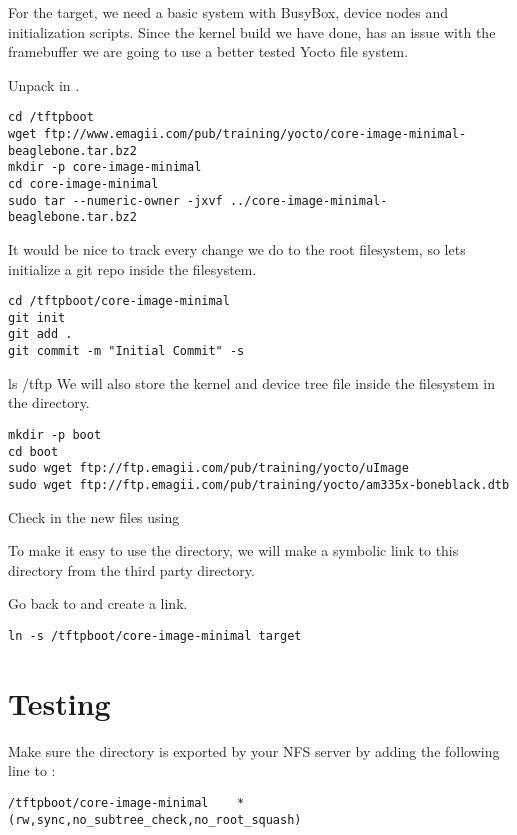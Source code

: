 For the target, we need a basic system with BusyBox, device nodes and
initialization scripts.
Since the kernel build we have done, has an issue with the framebuffer
we are going to use a better tested Yocto file system.

Unpack 
in .

\begin{verbatim}
cd /tftpboot
wget ftp://www.emagii.com/pub/training/yocto/core-image-minimal-beaglebone.tar.bz2
mkdir -p core-image-minimal
cd core-image-minimal
sudo tar --numeric-owner -jxvf ../core-image-minimal-beaglebone.tar.bz2
\end{verbatim}

It would be nice to track every change we do to the root filesystem,
so lets initialize a git repo inside the filesystem.

\begin{verbatim}
cd /tftpboot/core-image-minimal
git init
git add .
git commit -m "Initial Commit" -s
\end{verbatim}
ls /tftp	
We will also store the kernel and device tree file inside the filesystem in the  directory.

\begin{verbatim}
mkdir -p boot
cd boot
sudo wget ftp://ftp.emagii.com/pub/training/yocto/uImage
sudo wget ftp://ftp.emagii.com/pub/training/yocto/am335x-boneblack.dtb
\end{verbatim}

Check in the new files using 

To make it easy to use the directory, we will make a symbolic link to
this directory from the third party directory.

Go back to  and create a link.

\begin{verbatim}
ln -s /tftpboot/core-image-minimal target
\end{verbatim}
\clearpage

\section{Testing}


Make sure the  directory is exported by your NFS server
by adding the following line to :

\begin{verbatim}
/tftpboot/core-image-minimal	*(rw,sync,no_subtree_check,no_root_squash)
\end{verbatim}

